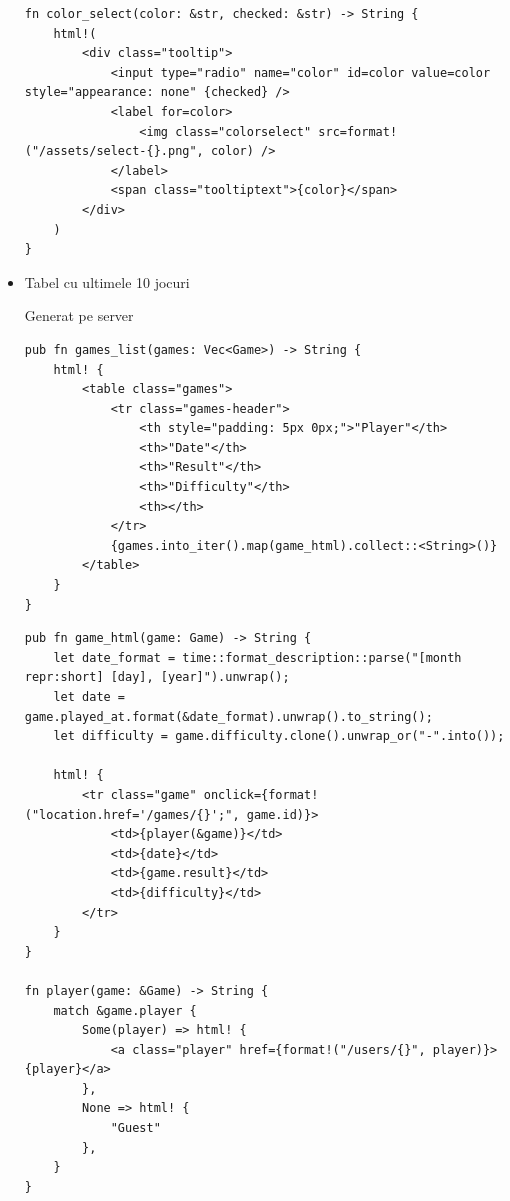 \begin{itemize}
\begin{lstlisting}[language=RustHtml]
fn color_select(color: &str, checked: &str) -> String {
    html!(
        <div class="tooltip">
            <input type="radio" name="color" id=color value=color style="appearance: none" {checked} />
            <label for=color>
                <img class="colorselect" src=format!("/assets/select-{}.png", color) />
            </label>
            <span class="tooltiptext">{color}</span>
        </div>
    )
}
\end{lstlisting}

	\item Tabel cu ultimele 10 jocuri

	      Generat pe server

	      \begin{lstlisting}[language=RustHtml]
pub fn games_list(games: Vec<Game>) -> String {
    html! {
        <table class="games">
            <tr class="games-header">
                <th style="padding: 5px 0px;">"Player"</th>
                <th>"Date"</th>
                <th>"Result"</th>
                <th>"Difficulty"</th>
                <th></th>
            </tr>
            {games.into_iter().map(game_html).collect::<String>()}
        </table>
    }
}
\end{lstlisting}

	      \begin{lstlisting}[language=RustHtml]
pub fn game_html(game: Game) -> String {
    let date_format = time::format_description::parse("[month repr:short] [day], [year]").unwrap();
    let date = game.played_at.format(&date_format).unwrap().to_string();
    let difficulty = game.difficulty.clone().unwrap_or("-".into());

    html! {
        <tr class="game" onclick={format!("location.href='/games/{}';", game.id)}>
            <td>{player(&game)}</td>
            <td>{date}</td>
            <td>{game.result}</td>
            <td>{difficulty}</td>
        </tr>
    }
}

fn player(game: &Game) -> String {
    match &game.player {
        Some(player) => html! {
            <a class="player" href={format!("/users/{}", player)}>{player}</a>
        },
        None => html! {
            "Guest"
        },
    }
}
\end{lstlisting}
\end{itemize}
